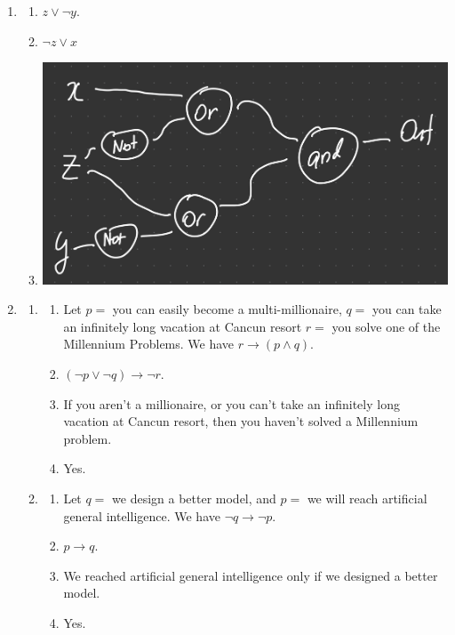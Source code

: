 \documentclass[12pt]{article}
\theoremstyle{definition}
\theoremstyle{remark}
\newcommand{\ra}{\rightarrow}
\begin{document}
\begin{enumerate}[leftmargin=\labelsep]
	\newpage
	\item 
	\begin{enumerate}
		\item $z \lor \lnot y$.
		\item $\lnot z \lor x$
		\item \includegraphics[scale=0.15]{circuit.png}
	\end{enumerate}

	\newpage
	\item 
	\begin{enumerate}
		\item 
		\begin{enumerate}
			\item Let $p = $ you can easily become a multi-millionaire, $q = $ you can take an infinitely long vacation at Cancun resort $r = $ you solve one of the Millennium Problems. We have $r \ra (p \land q)$.
			\item 
			$(\lnot p \lor \lnot q) \ra \lnot r$.
			\item If you aren't a millionaire, or you can't take an infinitely long vacation at Cancun resort, then you haven't solved a Millennium problem.
			\item Yes.
		\end{enumerate}
		\item 
		\begin{enumerate}
			\item Let $q = $ we design a better model, and $p = $ we will reach artificial general intelligence. We have $\lnot q \ra \lnot p$.
			\item 
			$p \ra q$. 
			\item We reached artificial general intelligence only if we designed a better model.
			\item Yes.
		\end{enumerate}
	\end{enumerate}


\end{enumerate}
\end{document}
